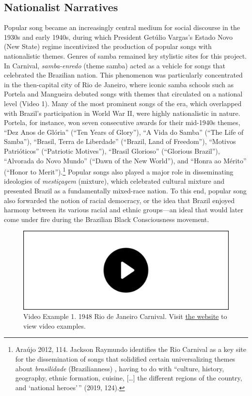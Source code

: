 \documentclass[twoside]{article}
\providecommand{\wmturlcaption}{
  Visit \href{https://worldmusictextbook.org/mcnally-2021}{the website} to view video examples.
}
\begin{document}
\hypertarget{nationalist-narratives}{%
\subsection*{Nationalist Narratives}\label{nationalist-narratives}}

Popular song became an increasingly central medium for social discourse
in the 1930s and early 1940s, during which President Getúlio Vargas's
Estado Novo (New State) regime incentivized the production of popular
songs with nationalistic themes. Genres of samba remained key stylistic
sites for this project. In Carnival, \emph{samba-enredo} (theme samba)
acted as a vehicle for songs that celebrated the Brazilian nation. This
phenomenon was particularly concentrated in the then-capital city of Rio
de Janeiro, where iconic samba schools such as Portela and Mangueira
debuted songs with themes that circulated on a national level (Video 1).
Many of the most prominent songs of the era, which overlapped with
Brazil's participation in World War II, were highly nationalistic in
nature. Portela, for instance, won seven consecutive awards for their
mid-1940s themes, ``Dez Anos de Glória'' (``Ten Years of Glory''), ``A
Vida do Samba'' (``The Life of Samba''), ``Brasil, Terra de Liberdade''
(``Brazil, Land of Freedom''), ``Motivos Patrióticos'' (``Patriotic
Motives''), ``Brasil Glorioso'' (``Glorious Brazil''), ``Alvorada do
Novo Mundo'' (``Dawn of the New World''), and ``Honra ao Mérito''
(``Honor to Merit'').\footnote{Araújo 2012, 114. Jackson Raymundo
  identifies the Rio Carnival as a key site for the dissemination of
  songs that solidified certain universalizing themes about
  \emph{brasilidade} (Brazilianness) , having to do with ``culture,
  history, geography, ethnic formation, cuisine, {[}\ldots{]} the
  different regions of the country, and `national heroes'\,'' (2019,
  124).} Popular songs also played a major role in disseminating
ideologies of \emph{mestiçagem} (mixture), which celebrated cultural
mixture and presented Brazil as a fundamentally mixed-race nation. To
this end, popular song also forwarded the notion of racial democracy, or
the idea that Brazil enjoyed harmony between its various racial and
ethnic groups---an ideal that would later come under fire during the
Brazilian Black Consciousness movement.

\begin{figure}
  \includegraphics[width=\textwidth]{../play-video.png}
  \caption*{Video Example 1. 1948 Rio de Janeiro Carnival. \wmturlcaption}
\end{figure}
\end{document}
